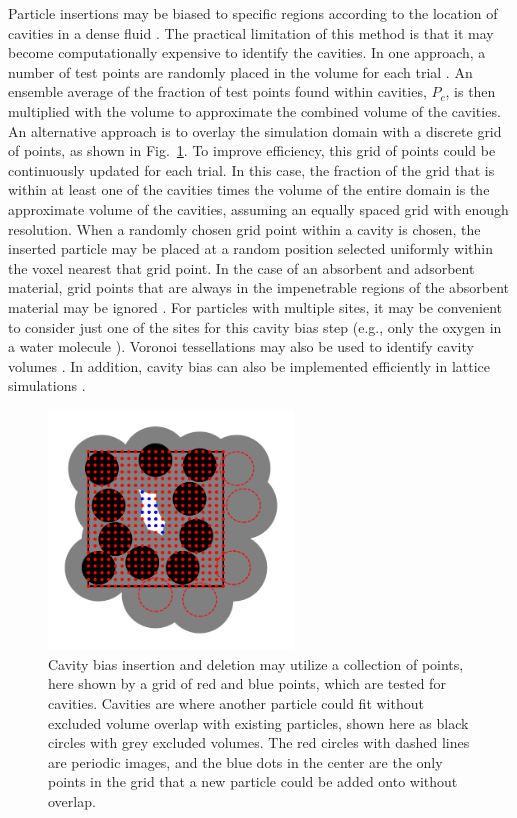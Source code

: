 \documentclass[
  9pt,
  bestpractices,
  pubversion,
]{livecoms}
\begin{document}
Particle insertions may be biased to specific regions according to the location of cavities in a dense fluid \cite{mezei_cavity-biased_1980, mezei_grand-canonical_1987, snurr_prediction_1993, ikeda_generalization_2024}.
The practical limitation of this method is that it may become computationally expensive to identify the cavities.
In one approach, a number of test points are randomly placed in the volume for each trial \cite{mezei_cavity-biased_1980, mezei_grand-canonical_1987, snurr_prediction_1993}.
An ensemble average of the fraction of test points found within cavities, $P_c$, is then multiplied with the volume to approximate the combined volume of the cavities.
An alternative approach is to overlay the simulation domain with a discrete grid of points, as shown in Fig.~\ref{fig:cavity}.
To improve efficiency, this grid of points could be continuously updated for each trial.
In this case, the fraction of the grid that is within at least one of the cavities times the volume of the entire domain is the approximate volume of the cavities, assuming an equally spaced grid with enough resolution.
When a randomly chosen grid point within a cavity is chosen, the inserted particle may be placed at a random position selected uniformly within the voxel nearest that grid point.
In the case of an absorbent and adsorbent material, grid points that are always in the impenetrable regions of the absorbent material may be ignored \cite{snurr_prediction_1993}.
For particles with multiple sites, it may be convenient to consider just one of the sites for this cavity bias step (e.g., only the oxygen in a water molecule \cite{zhang_computational_2017}).
Voronoi tessellations may also be used to identify cavity volumes \cite{sastry_statistical_1997}.
In addition, cavity bias can also be implemented efficiently in lattice simulations \cite{barnes_structure_2009}.

\begin{figure}
\begin{centering}
\includegraphics[width=6.5cm]{../figures/cavity.pdf}
\caption{
Cavity bias insertion and deletion may utilize a collection of points, here shown by a grid of red and blue points, which are tested for cavities.
Cavities are where another particle could fit without excluded volume overlap with existing particles, shown here as black circles with grey excluded volumes.
The red circles with dashed lines are periodic images, and the blue dots in the center are the only points in the grid that a new particle could be added onto without overlap.
}
\label{fig:cavity}
\end{centering}
\end{figure}
\end{document}
